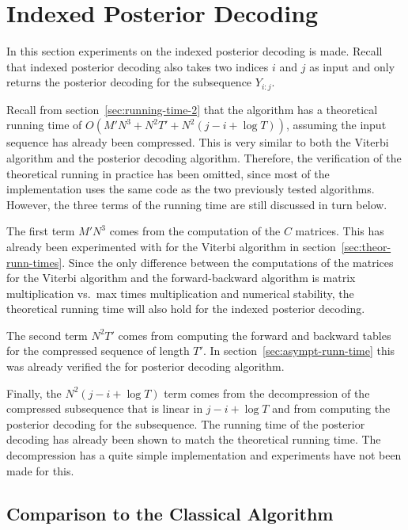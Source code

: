\section{Indexed Posterior Decoding}

In this section experiments on the indexed posterior decoding is
made. Recall that indexed posterior decoding also takes two indices $i$ and
$j$ as input and only returns the posterior decoding for the subsequence
$Y_{i:j}$.

Recall from section~\ref{sec:running-time-2} that the algorithm has a
theoretical running time of $O(M' N^3 + N^2 T' + N^2 (j - i + \log T))$,
assuming the input sequence has already been compressed. This is very similar
to both the Viterbi algorithm and the posterior decoding algorithm. Therefore,
the verification of the theoretical running in practice has been omitted, since
most of the implementation uses the same code as the two previously tested
algorithms. However, the three terms of the running time are still discussed in
turn below.

The first term $M' N^3$ comes from the computation of the $C$ matrices. This
has already been experimented with for the Viterbi algorithm in
section~\ref{sec:theor-runn-times}. Since the only difference between the
computations of the matrices for the Viterbi algorithm and the forward-backward
algorithm is matrix multiplication vs.\ max times multiplication and numerical
stability, the theoretical running time will also hold for the indexed posterior
decoding.

The second term $N^2 T'$ comes from computing the forward and backward tables
for the compressed sequence of length $T'$. In
section~\ref{sec:asympt-runn-time} this was already verified the for posterior
decoding algorithm.

Finally, the $N^2 (j - i + \log T)$ term comes from the decompression of the
compressed subsequence that is linear in $j - i + \log T$ and from computing
the posterior decoding for the subsequence. The running time of the posterior
decoding has already been shown to match the theoretical running time. The
decompression has a quite simple implementation and experiments have not been
made for this. 

\subsection{Comparison to the Classical Algorithm}

